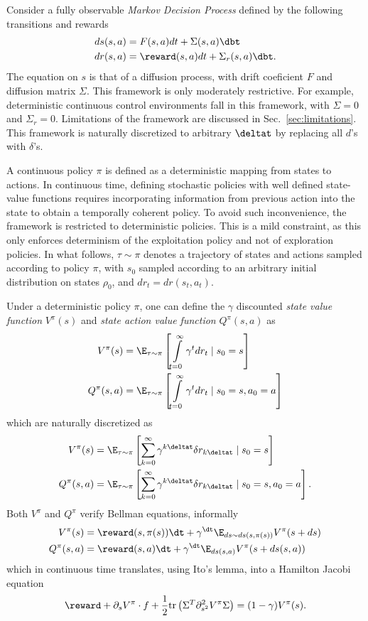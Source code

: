 Consider a fully observable \emph{Markov Decision Process} defined by the following
transitions and rewards
\begin{align}
	ds(s, a) &= F(s, a) dt + \Sigma(s, a) \dbt\\
	dr(s, a) &= \reward(s, a) dt + \Sigma_r(s, a) \dbt.
\end{align}
The equation on $s$ is that of a diffusion process, with drift coeficient $F$
and diffusion matrix $\Sigma$.  This framework is only moderately restrictive.
For example, deterministic continuous control environments fall in this
framework, with $\Sigma = 0$ and $\Sigma_r = 0$. Limitations of the framework
are discussed in Sec.~\ref{sec:limitations}.
This framework is naturally discretized to arbitrary $\deltat$ by replacing all
$d$'s with $\delta$'s.

A continuous policy $\pi$ is defined as a deterministic mapping from states to
actions.  In continuous time, defining stochastic policies with well defined
state-value functions requires incorporating information from previous action into
the state to obtain a temporally coherent policy. To avoid such inconvenience, the
framework is restricted to deterministic policies. This is a mild constraint, as this
only enforces determinism of the exploitation policy and not of exploration policies.
In what follows, $\tau\sim\pi$ denotes a trajectory of states and actions sampled
according to policy $\pi$, with $s_0$ sampled according to an arbitrary initial distribution
on states $\rho_0$, and $dr_{t} = dr(s_t, a_t)$.

Under a deterministic policy $\pi$, one can define the $\gamma$ discounted
\emph{state value function} $V^\pi(s)$ and \emph{state action value function}
$Q^\pi(s, a)$ as
\begin{align}
	V^\pi(s) &= \E_{\tau\sim\pi}\left[
		\int\limits_{t=0}^\infty \gamma^{t}
		dr_{t} \mid s_0 = s
	\right]\\
	Q^\pi(s, a) &= \E_{\tau\sim\pi}\left[
		\int\limits_{t=0}^\infty \gamma^{t}
		dr_{t} \mid s_0 = s, a_0 = a
	\right]
\end{align}
which are naturally discretized as
\begin{align}
	V^\pi(s) &= \E_{\tau\sim\pi}\left[
		\sum\limits_{k=0}^\infty \gamma^{k\deltat}
		\delta r_{k\deltat} \mid s_0 = s
	\right]\\
	Q^\pi(s, a) &= \E_{\tau\sim\pi}\left[
		\sum\limits_{k=0}^\infty \gamma^{k\deltat}
		\delta r_{k\deltat} \mid s_0 = s, a_0 = a
	\right].
\end{align}
Both $V^\pi$ and $Q^\pi$ verify Bellman equations, informally
\begin{align}
	V^\pi(s) &= \reward(s, \pi(s))\dt + \gamma^{\dt} \E_{ds \sim ds(s, \pi(s))} V^\pi(s + ds)\nonumber\\
	Q^\pi(s, a) &= \reward(s, a)\dt + \gamma^{\dt} \E_{ds(s, a)} V^\pi(s + ds(s, a))
	\label{eq:cont_bell}
\end{align}
which in continuous time translates, using Ito's lemma, into a Hamilton Jacobi equation
\begin{align}
	\reward + \partial_s V^\pi \cdot f + \frac{1}{2} \text{tr}\left(\Sigma^T\partial^2_{s^2} V^\pi\Sigma\right) = (1 - \gamma) V^\pi(s).
\end{align}

